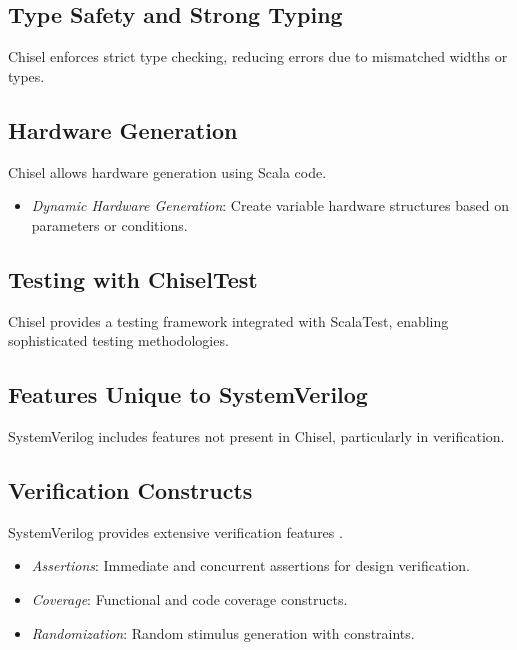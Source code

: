 \subsection{Type Safety and Strong Typing}

Chisel enforces strict type checking, reducing errors due to mismatched widths or types.

\subsection{Hardware Generation}

Chisel allows hardware generation using Scala code.

\begin{itemize}
    \item \textit{Dynamic Hardware Generation}: Create variable hardware structures based on parameters or conditions.
\end{itemize}

\subsection{Testing with ChiselTest}

Chisel provides a testing framework integrated with ScalaTest, enabling sophisticated testing methodologies.

\subsection{Features Unique to SystemVerilog}

SystemVerilog includes features not present in Chisel, particularly in verification.

\subsection{Verification Constructs}

SystemVerilog provides extensive verification features \cite{foster2003assertions}.

\begin{itemize}
    \item \textit{Assertions}: Immediate and concurrent assertions for design verification.
    \item \textit{Coverage}: Functional and code coverage constructs.
    \item \textit{Randomization}: Random stimulus generation with constraints.
\end{itemize}

